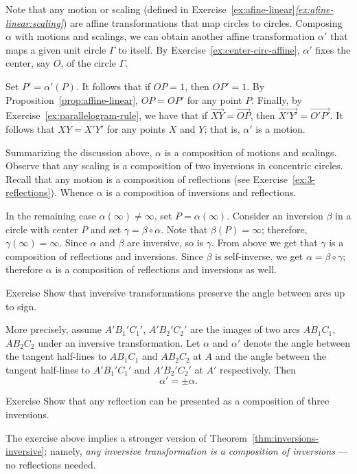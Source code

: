 Note that any motion or scaling (defined in Exercise~\ref{ex:afine-linear}\textit{\ref{ex:afine-linear:scaling}}) are affine transformations that map circles to circles.
Composing $\alpha$ with motions and scalings, we can obtain another affine transformation $\alpha'$ that maps a given unit circle $\Gamma$ to itself.
By Exercise~\ref{ex:center-circ-affine},
$\alpha'$ fixes the center, say $O$, of the circle $\Gamma$.

Set $P'=\alpha'(P)$.
It follows that if $OP=1$, then $OP'=1$.
By Proposition~\ref{prop:affine-linear}, $OP=OP'$ for any point $P$.
Finally, by Exercise~\ref{ex:parallelogram-rule}, we have that if 
$\overrightarrow{XY}=\overrightarrow{OP}$, then $\overrightarrow{X'Y'}=\overrightarrow{O'P'}$.
It follows that $XY=X'Y'$ for any points $X$ and $Y$;
that is, $\alpha'$ is a motion.

Summarizing the discussion above, $\alpha$ is a composition of motions and scalings.
Observe that any scaling is a composition of two inversions in concentric circles.
Recall that any motion is a composition of reflections (see Exercise~\ref{ex:3-reflections}).
Whence $\alpha$ is a composition of inversions and reflections.


In the remaining case $\alpha(\infty)\ne \infty$, set $P=\alpha(\infty)$.
Consider an inversion $\beta$ in a circle with center $P$ and set $\gamma=\beta\circ\alpha$.
Note that $\beta(P)=\infty$; 
therefore, $\gamma(\infty)=\infty$.
Since $\alpha$ and $\beta$ are inversive, so is $\gamma$.
From above we get that $\gamma$ is a composition of reflections and inversions.
Since $\beta$ is self-inverse, we get
$\alpha=\beta\circ\gamma$;
therefore $\alpha$ is a composition of reflections and inversions as well.
\qeds

\begin{thm}{Exercise}\label{ex:inversive-angle}
Show that inversive transformations preserve the angle between arcs up to sign.

More precisely, assume $A'B_1'C_1'$, $A'B_2'C_2'$ are the images of two arcs $AB_1C_1$, $AB_2C_2$ under an inversive transformation.
Let $\alpha$ and $\alpha'$ denote the angle between the tangent half-lines to $AB_1C_1$ and $AB_2C_2$ at $A$
and the angle between the tangent half-lines to $A'B_1'C_1'$ and $A'B_2'C_2'$ at $A'$ respectively.
Then 
\[\alpha'=\pm \alpha.\]
\end{thm}


\begin{thm}{Exercise}\label{ex:reflection/inversive}
Show that any reflection can be presented as a composition of three inversions. 
\end{thm}

The exercise above implies a stronger version of Theorem~\ref{thm:inversions-inversive};
namely, \emph{any inversive transformation is a composition of inversions} ---
no reflections needed.
